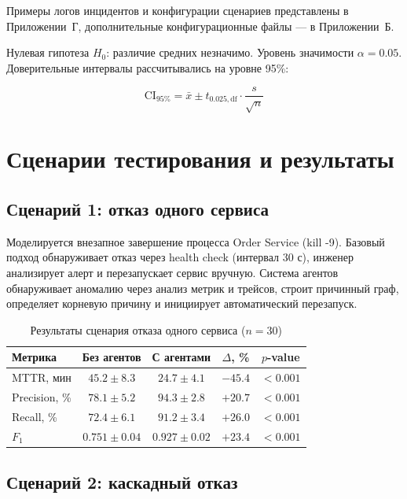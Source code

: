 Примеры логов инцидентов и конфигурации сценариев представлены в Приложении~Г, дополнительные конфигурационные файлы --- в Приложении~Б.

Нулевая гипотеза $H_0$: различие средних незначимо. Уровень значимости $\alpha = 0.05$. Доверительные интервалы рассчитывались на уровне 95\%:

\begin{equation}
\text{CI}_{95\%} = \bar{x} \pm t_{0.025, \text{df}} \cdot \frac{s}{\sqrt{n}}
\label{eq:confidence_interval}
\end{equation}

\section{Сценарии тестирования и результаты}

\subsection{Сценарий 1: отказ одного сервиса}

Моделируется внезапное завершение процесса Order Service (kill -9). Базовый подход обнаруживает отказ через health check (интервал 30 с), инженер анализирует алерт и перезапускает сервис вручную. Система агентов обнаруживает аномалию через анализ метрик и трейсов, строит причинный граф, определяет корневую причину и инициирует автоматический перезапуск.

\begin{table}[H]
\centering
\small
\caption{Результаты сценария отказа одного сервиса ($n = 30$)}
\label{tab:scenario1_results}
\begin{tabular}{|l|c|c|c|c|}
\hline
\textbf{Метрика} & \textbf{Без агентов} & \textbf{С агентами} & \textbf{$\Delta$, \%} & \textbf{$p$-value} \\
\hline
MTTR, мин & $45.2 \pm 8.3$ & $24.7 \pm 4.1$ & $-45.4$ & $< 0.001$ \\
\hline
Precision, \% & $78.1 \pm 5.2$ & $94.3 \pm 2.8$ & $+20.7$ & $< 0.001$ \\
\hline
Recall, \% & $72.4 \pm 6.1$ & $91.2 \pm 3.4$ & $+26.0$ & $< 0.001$ \\
\hline
$F_1$ & $0.751 \pm 0.04$ & $0.927 \pm 0.02$ & $+23.4$ & $< 0.001$ \\
\hline
\end{tabular}
\end{table}

\subsection{Сценарий 2: каскадный отказ}

